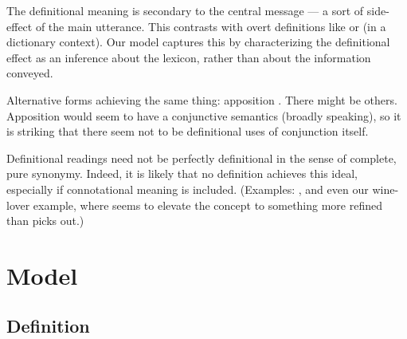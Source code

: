 \documentclass{article}
\begin{document}
\begin{examples}
\item The definitional meaning is secondary to the central message ---
  a sort of side-effect of the main utterance. This contrasts with
  overt definitions like  or
   (in a dictionary context). Our model
  captures this by characterizing the definitional effect as an
  inference about the lexicon, rather than about the information
  conveyed.
  
\item Alternative forms achieving the same thing: apposition
  . There might be others. Apposition
  would seem to have a conjunctive semantics (broadly speaking), so it
  is striking that there seem not to be definitional uses of
  conjunction itself.

\item Definitional readings need not be perfectly definitional in the
  sense of complete, pure synonymy. Indeed, it is likely that no
  definition achieves this ideal, especially if connotational meaning
  is included. (Examples: , and
  even our wine-lover example, where  seems to elevate
  the concept to something more refined than  picks
  out.)
\end{examples}


\section{Model}\label{sec:model}


\subsection{Definition}\label{sec:definition}
\end{document}

